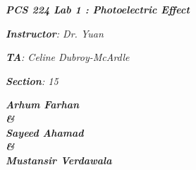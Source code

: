 

\begin{titlepage}
    \begin{center}
        \vspace*{1cm}
            
        \date{}
            
        \huge
            
        \textit{\textbf{PCS 224 Lab 1 : Photoelectric Effect}}
            
        \vspace{0.25cm}
            
            
            
		\vspace{0.25cm}
            
            
        \LARGE
            

		\textit{\textbf{Instructor}: Dr. Yuan}

		\textit{\textbf{TA}: Celine Dubroy-McArdle}

		\textit{\textbf{Section}: 15}

		\vspace{2.5cm}

		\textit{\textbf{Arhum Farhan \\ \& \\ Sayeed Ahamad \\ \& \\ Mustansir Verdawala}}
            
            
        \Large         

		\vspace{5cm}

		\vspace{0cm}            
            
		\Large		
		        
		

\end{center}
\end{titlepage}
